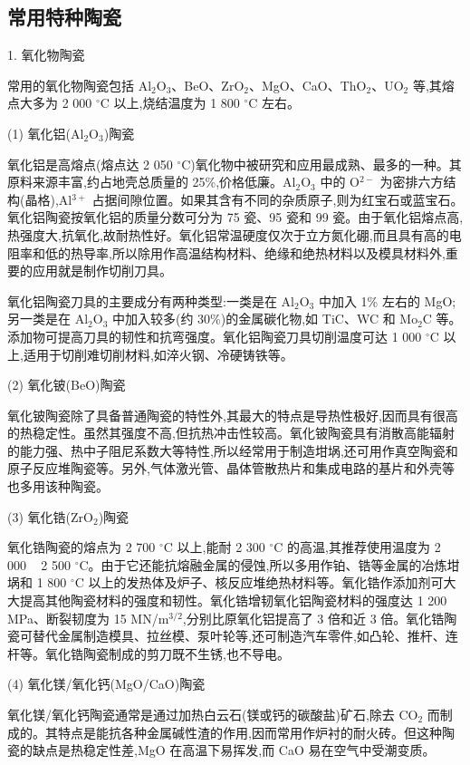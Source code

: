 \documentclass[UTF8]{ctexbook}
\newcommand{\◎}{\ensuremath{\bigcirc}}
\begin{document}
\subsection{常用特种陶瓷}

1. 氧化物陶瓷

常用的氧化物陶瓷包括 Al$_2$O$_3$、BeO、ZrO$_2$、MgO、CaO、ThO$_2$、UO$_2$ 等,其熔点大多为 2 000 $^\circ$C 以上,烧结温度为 1 800 $^\circ$C 左右。

(1) 氧化铝(Al$_2$O$_3$)陶瓷

氧化铝是高熔点(熔点达 2 050 $^\circ$C)氧化物中被研究和应用最成熟、最多的一种。其原料来源丰富,约占地壳总质量的 25\%,价格低廉。Al$_2$O$_3$ 中的 O$^{2-}$ 为密排六方结构(晶格),Al$^{3+}$ 占据间隙位置。如果其含有不同的杂质原子,则为红宝石或蓝宝石。氧化铝陶瓷按氧化铝的质量分数可分为 75 瓷、95 瓷和 99 瓷。由于氧化铝熔点高,热强度大,抗氧化,故耐热性好。氧化铝常温硬度仅次于立方氮化硼,而且具有高的电阻率和低的热导率,所以除用作高温结构材料、绝缘和绝热材料以及模具材料外,重要的应用就是制作切削刀具。

氧化铝陶瓷刀具的主要成分有两种类型:一类是在 Al$_2$O$_3$ 中加入 1\% 左右的 MgO;另一类是在 Al$_2$O$_3$ 中加入较多(约 30\%)的金属碳化物,如 TiC、WC 和 Mo$_2$C 等。添加物可提高刀具的韧性和抗弯强度。氧化铝陶瓷刀具切削温度可达 1 000 $^\circ$C 以上,适用于切削难切削材料,如淬火钢、冷硬铸铁等。

(2) 氧化铍(BeO)陶瓷

氧化铍陶瓷除了具备普通陶瓷的特性外,其最大的特点是导热性极好,因而具有很高的热稳定性。虽然其强度不高,但抗热冲击性较高。氧化铍陶瓷具有消散高能辐射的能力强、热中子阻尼系数大等特性,所以经常用于制造坩埚,还可用作真空陶瓷和原子反应堆陶瓷等。另外,气体激光管、晶体管散热片和集成电路的基片和外壳等也多用该种陶瓷。

(3) 氧化锆(ZrO$_2$)陶瓷

氧化锆陶瓷的熔点为 2 700 $^\circ$C 以上,能耐 2 300 $^\circ$C 的高温,其推荐使用温度为 2 000 ~ 2 500 $^\circ$C。由于它还能抗熔融金属的侵蚀,所以多用作铂、锆等金属的冶炼坩埚和 1 800 $^\circ$C 以上的发热体及炉子、核反应堆绝热材料等。氧化锆作添加剂可大大提高其他陶瓷材料的强度和韧性。氧化锆增韧氧化铝陶瓷材料的强度达 1 200 MPa、断裂韧度为 15 MN/m$^{3/2}$,分别比原氧化铝提高了 3 倍和近 3 倍。氧化锆陶瓷可替代金属制造模具、拉丝模、泵叶轮等,还可制造汽车零件,如凸轮、推杆、连杆等。氧化锆陶瓷制成的剪刀既不生锈,也不导电。

(4) 氧化镁/氧化钙(MgO/CaO)陶瓷

氧化镁/氧化钙陶瓷通常是通过加热白云石(镁或钙的碳酸盐)矿石,除去 CO$_2$ 而制成的。其特点是能抗各种金属碱性渣的作用,因而常用作炉衬的耐火砖。但这种陶瓷的缺点是热稳定性差,MgO 在高温下易挥发,而 CaO 易在空气中受潮变质。
\end{document}
